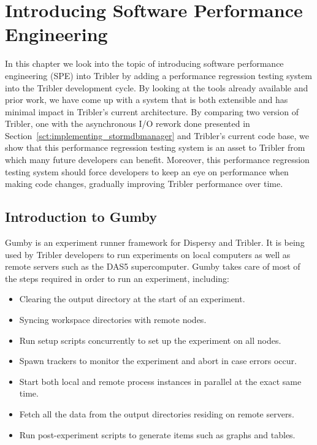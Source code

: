 \chapter{Introducing Software Performance Engineering}
\label{cpt:software_performance_engineering}

In this chapter we look into the topic of introducing software performance engineering (SPE) into Tribler by adding a performance regression testing system into the Tribler development cycle.
By looking at the tools already available and prior work, we have come up with a system that is both extensible and has minimal impact in Tribler's current architecture.
By comparing two version of Tribler, one with the asynchronous I/O rework done presented in Section~\ref{sct:implementing_stormdbmanager} and Tribler's current code base, we show that this performance regression testing system is an asset to Tribler from which many future developers can benefit.
Moreover, this performance regression testing system should force developers to keep an eye on performance when making code changes, gradually improving Tribler performance over time.

\section{Introduction to Gumby}
\label{sct:gumby_introduction}

Gumby is an experiment runner framework for Dispersy and Tribler.
It is being used by Tribler developers to run experiments on local computers as well as remote servers such as the DAS5 supercomputer.
Gumby takes care of most of the steps required in order to run an experiment, including:

\begin{itemize}
	\item Clearing the output directory at the start of an experiment.
	\item Syncing workspace directories with remote nodes.
	\item Run setup scripts concurrently to set up the experiment on all nodes.
	\item Spawn trackers to monitor the experiment and abort in case errors occur.
	\item Start both local and remote process instances in parallel at the exact same time.
	\item Fetch all the data from the output directories residing on remote servers.
	\item Run post-experiment scripts to generate items such as graphs and tables.
\end{itemize}

